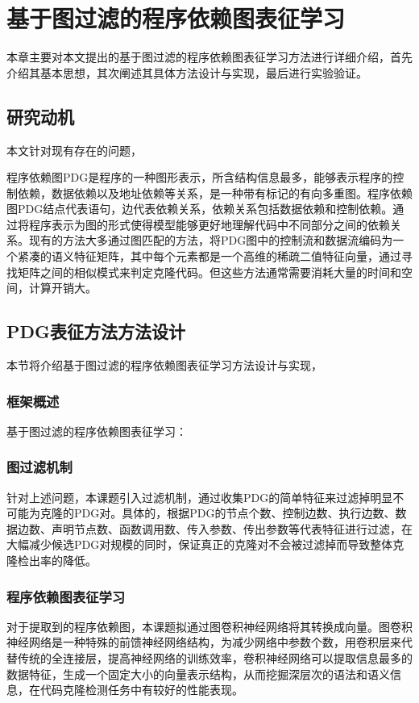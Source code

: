 \chapter{基于图过滤的程序依赖图表征学习}
\label{chap:PDG}
本章主要对本文提出的基于图过滤的程序依赖图表征学习方法进行详细介绍，首先介绍其基本思想，其次阐述其具体方法设计与实现，最后进行实验验证。

\section{研究动机}
\label{sec:PDGMotivation}
本文针对现有存在的问题，

程序依赖图PDG是程序的一种图形表示，所含结构信息最多，能够表示程序的控制依赖，数据依赖以及地址依赖等关系，是一种带有标记的有向多重图。程序依赖图PDG结点代表语句，边代表依赖关系，依赖关系包括数据依赖和控制依赖。通过将程序表示为图的形式使得模型能够更好地理解代码中不同部分之间的依赖关系。现有的方法大多通过图匹配的方法，将PDG图中的控制流和数据流编码为一个紧凑的语义特征矩阵，其中每个元素都是一个高维的稀疏二值特征向量，通过寻找矩阵之间的相似模式来判定克隆代码。但这些方法通常需要消耗大量的时间和空间，计算开销大。
\section{PDG表征方法方法设计}
\label{sec:PDG}
本节将介绍基于图过滤的程序依赖图表征学习方法设计与实现， 

\subsection{框架概述}
\label{subsec:PDGOverview}
基于图过滤的程序依赖图表征学习：

\subsection{图过滤机制}
\label{subsec:PDGPreModel}
针对上述问题，本课题引入过滤机制，通过收集PDG的简单特征来过滤掉明显不可能为克隆的PDG对。具体的，根据PDG的节点个数、控制边数、执行边数、数据边数、声明节点数、函数调用数、传入参数、传出参数等代表特征进行过滤，在大幅减少候选PDG对规模的同时，保证真正的克隆对不会被过滤掉而导致整体克隆检出率的降低。

\subsection{程序依赖图表征学习}
\label{subsec:PDGModel}
对于提取到的程序依赖图，本课题拟通过图卷积神经网络将其转换成向量。图卷积神经网络是一种特殊的前馈神经网络结构，为减少网络中参数个数，用卷积层来代替传统的全连接层，提高神经网络的训练效率，卷积神经网络可以提取信息最多的数据特征，生成一个固定大小的向量表示结构，从而挖掘深层次的语法和语义信息，在代码克隆检测任务中有较好的性能表现。


